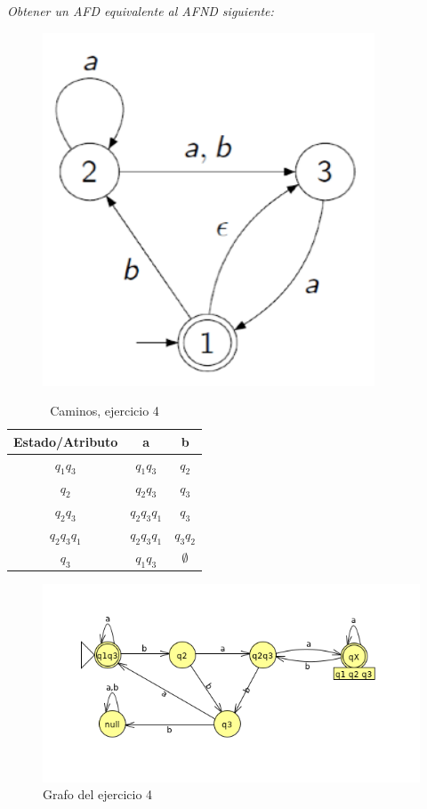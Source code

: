 \textit{Obtener un AFD equivalente al AFND siguiente:}

\begin{figure}[H]
\centering
\includegraphics[width=0.3\linewidth]{image/ejercicio04}
\end{figure}

\begin{table}[H]
	\centering
	\begin{tabular}[scale 0.3]{|c|c|c|}
		\hline
		\textbf{Estado/Atributo} & a & b \\
		\hline \hline
		$ q_{1} q_{3} $ & $ q_{1} q_{3} $ & $ q_{2} $ \\
		\hline
		$ q_{2} $ & $ q_{2} q_{3} $ & $ q_{3} $ \\
		\hline
		$ q_{2} q_{3} $ & $ q_{2} q_{3} q_{1} $ & $ q_{3} $ \\
		\hline
		$  q_{2} q_{3} q_{1} $ & $  q_{2} q_{3} q_{1} $ & $ q_{3} q_{2} $ \\
		\hline
		$ q_{3} $ & $ q_{1} q_{3} $ & $ \emptyset $ \\
		\hline		
	\end{tabular} 
	 \caption[prac 2 - ejer 2C]{Caminos, ejercicio 4}
\end{table}

\begin{figure}[H]
	\centering
	\includegraphics[width=1\linewidth]{image/ejercicio8}
	\caption[prac 2 - ejer 2C]{Grafo del ejercicio 4}
	\label{fig:ejercicio45}
\end{figure}


